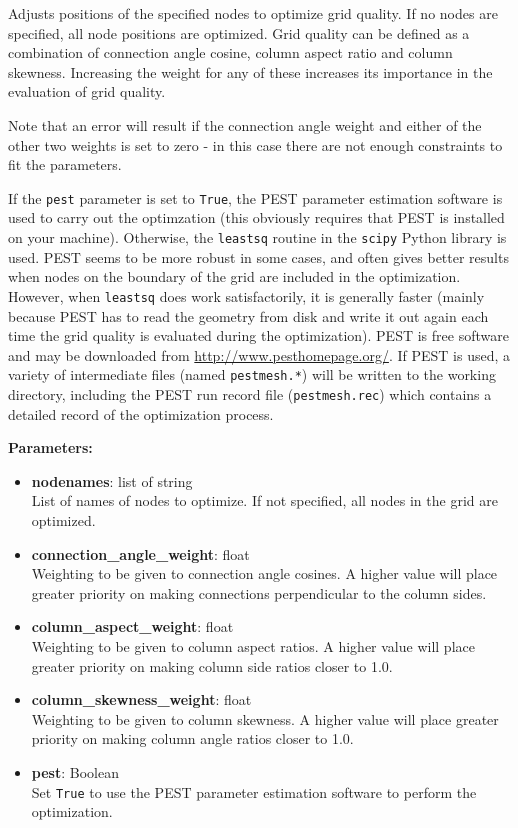 Adjusts positions of the specified nodes to optimize grid quality.  If no nodes are specified, all node positions are optimized.  Grid quality can be defined as a combination of connection angle cosine, column aspect ratio and column skewness.  Increasing the weight for any of these increases its importance in the evaluation of grid quality.

Note that an error will result if the connection angle weight and either of the other two weights is set to zero - in this case there are not enough constraints to fit the parameters.

If the \texttt{pest} parameter is set to \texttt{True}, the PEST parameter estimation software is used to carry out the optimzation (this obviously requires that PEST is installed on your machine).  Otherwise, the \texttt{leastsq} routine in the \texttt{scipy} Python library is used.  PEST seems to be more robust in some cases, and often gives better results when nodes on the boundary of the grid are included in the optimization. However, when \texttt{leastsq} does work satisfactorily, it is generally faster (mainly because PEST has to read the geometry from disk and write it out again each time the grid quality is evaluated during the optimization).  PEST is free software and may be downloaded from \url{http://www.pesthomepage.org/}.  If PEST is used, a variety of intermediate files (named \texttt{pestmesh.*}) will be written to the working directory, including the PEST run record file (\texttt{pestmesh.rec}) which contains a detailed record of the optimization process.

\textbf{Parameters:}
\begin{itemize}
\item \textbf{nodenames}: list of string\\
  List of names of nodes to optimize.  If not specified, all nodes in the grid are optimized.
\item \textbf{connection\_angle\_weight}: float\\
  Weighting to be given to connection angle cosines.  A higher value will place greater priority on making connections perpendicular to the column sides.
\item \textbf{column\_aspect\_weight}: float\\
  Weighting to be given to column aspect ratios.  A higher value will place greater priority on making column side ratios closer to 1.0.
\item \textbf{column\_skewness\_weight}: float\\
  Weighting to be given to column skewness.  A higher value will place greater priority on making column angle ratios closer to 1.0.
\item \textbf{pest}: Boolean\\
  Set \texttt{True} to use the PEST parameter estimation software to perform the optimization.
\end{itemize}

